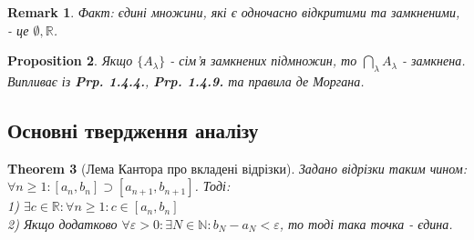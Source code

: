 \documentclass[a4paper, 14pt]{article}
\def\huge{\displaystyle}
\theoremstyle{theoremdd}
\newtheorem{theorem}{Theorem}[subsection]
\theoremstyle{theoremdd}
\theoremstyle{theoremdd}
\theoremstyle{theoremdd}
\theoremstyle{theoremdd}
\newtheorem{proposition}[theorem]{Proposition}
\theoremstyle{theoremdd}
\newtheorem{remark}[theorem]{Remark}
\theoremstyle{theoremdd}
\theoremstyle{theoremdd}
\begin{document}
\begin{remark}
Факт: єдині множини, які є одночасно відкритими та замкненими, - це $\emptyset, \mathbb{R}$.
\end{remark}

\begin{proposition}
Якщо $\{A_{\lambda}\}$ - сім'я замкнених підмножин, то $\huge \bigcap_{\lambda} A_{\lambda}$ - замкнена.\\
\textit{Випливає із} \textbf{Prp. 1.4.4.}, \textbf{Prp. 1.4.9.} \textit{та правила де Моргана.}
\end{proposition}
	
	\subsection{Основні твердження аналізу}
	\begin{theorem}[Лема Кантора про вкладені відрізки]
	Задано відрізки таким чином: $\forall n \geq 1: [a_n, b_n] \supset [a_{n+1}, b_{n+1}]$. Тоді:\\
	1) $\exists c \in \mathbb{R}: \forall n \geq 1: c \in [a_n,b_n]$\\
	2) Якщо додатково $\forall \varepsilon > 0: \exists N \in \mathbb{N}: b_N - a_N < \varepsilon$, то тоді така точка - єдина.
	\begin{figure}[H]
	\centering
	\end{figure}
	\end{theorem}
	
\end{document}
